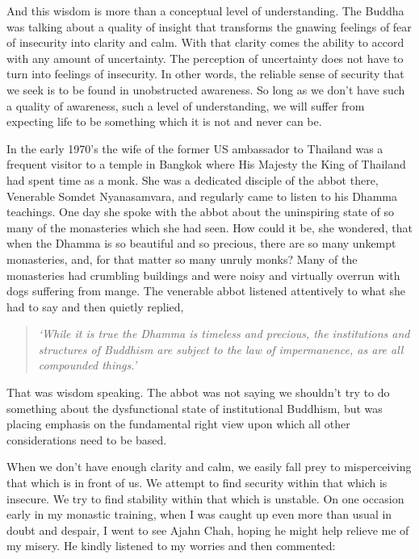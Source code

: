 And this wisdom is more than a conceptual level of understanding. The
Buddha was talking about a quality of insight that transforms the
gnawing feelings of fear of insecurity into clarity and calm. With that
clarity comes the ability to accord with any amount of uncertainty. The
perception of uncertainty does not have to turn into feelings of
insecurity. In other words, the reliable sense of security that we seek
is to be found in unobstructed awareness. So long as we don't have such
a quality of awareness, such a level of understanding, we will suffer
from expecting life to be something which it is not and never can be.

In the early 1970's the wife of the former US ambassador to Thailand was
a frequent visitor to a temple in Bangkok where His Majesty the King of
Thailand had spent time as a monk. She was a dedicated disciple of the
abbot there, Venerable Somdet Nyanasamvara, and regularly came to listen
to his Dhamma teachings. One day she spoke with the abbot about the
uninspiring state of so many of the monasteries which she had seen. How
could it be, she wondered, that when the Dhamma is so beautiful and so
precious, there are so many unkempt monasteries, and, for that matter so
many unruly monks? Many of the monasteries had crumbling buildings and
were noisy and virtually overrun with dogs suffering from mange. The
venerable abbot listened attentively to what she had to say and then
quietly replied,

\begin{quote}
\itshape
`While it is true the Dhamma is timeless and precious, the institutions
and structures of Buddhism are subject to the law of impermanence, as are
all compounded things.'
\end{quote}

That was wisdom speaking. The abbot was not saying we shouldn't try to do
something about the dysfunctional state of institutional Buddhism, but was
placing emphasis on the fundamental right view upon which all other
considerations need to be based.

\clearpage\mbox{}\thispagestyle{empty}
\clearpage

When we don't have enough clarity and calm, we easily fall prey to
misperceiving that which is in front of us. We attempt to find security
within that which is insecure. We try to find stability within that
which is unstable. On one occasion early in my monastic training, when I
was caught up even more than usual in doubt and despair, I went to see
Ajahn Chah, hoping he might help relieve me of my misery. He kindly
listened to my worries and then commented:

